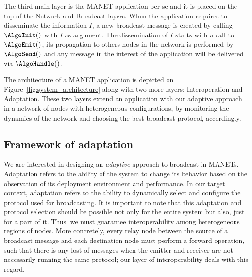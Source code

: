 The third main layer is the MANET application per se and it is placed on the top of the Network and Broadcast layers.
%
When the application requires to disseminate the information $I$, a new broadcast message is created by calling $\AlgoInit()$ with $I$ as argument.
%
The dissemination of $I$ starts with a call to $\AlgoEmit()$, its propagation to others nodes in the network is performed by $\AlgoSend()$ and any message in the interest of the application will be delivered via $\AlgoHandle()$.

The architecture of a MANET application is depicted on Figure~\ref{fig:system_architecture} along with two more layers: Interoperation and Adaptation.
%
These two layers extend an application with our adaptive approach in a network of nodes with heterogeneous configurations, by monitoring the dynamics of the network and choosing the best broadcast protocol, accordingly.


\subsection{Framework of adaptation}
We are interested in designing an \emph{adaptive} approach to broadcast in MANETs.
%
Adaptation refers to the ability of the system to change its behavior based on the observation of its deployment environment and performance.
%
In our target context, adaptation refers to the ability to dynamically select and configure the protocol used for broadcasting.
%
It is important to note that this adaptation and protocol selection should be possible not only for the entire system but also, just for a part of it.
%
Thus, we must guarantee interoperability among heterogeneous regions of nodes.
%
More concretely, every relay node between the source of a broadcast message and each destination node must perform a forward operation, such that there is any lost of messages when the emitter and receiver are not necessarily running the same protocol; our layer of interoperability deals with this regard.

